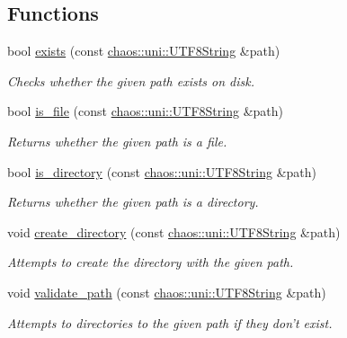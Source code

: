 \subsection*{Functions}
\begin{DoxyCompactItemize}
\item 
bool \hyperlink{namespacechaos_1_1io_1_1file_a30e2d7207df6af04322b7f9e11674825}{exists} (const \hyperlink{classchaos_1_1uni_1_1_u_t_f8_string}{chaos\-::uni\-::\-U\-T\-F8\-String} \&path)
\begin{DoxyCompactList}\small\item\em Checks whether the given path exists on disk. \end{DoxyCompactList}\item 
bool \hyperlink{namespacechaos_1_1io_1_1file_a310de03ae6c868be8379dc49fe45ea4d}{is\-\_\-file} (const \hyperlink{classchaos_1_1uni_1_1_u_t_f8_string}{chaos\-::uni\-::\-U\-T\-F8\-String} \&path)
\begin{DoxyCompactList}\small\item\em Returns whether the given path is a file. \end{DoxyCompactList}\item 
bool \hyperlink{namespacechaos_1_1io_1_1file_ad9890ac8b9dcf3c948274222995c3ea0}{is\-\_\-directory} (const \hyperlink{classchaos_1_1uni_1_1_u_t_f8_string}{chaos\-::uni\-::\-U\-T\-F8\-String} \&path)
\begin{DoxyCompactList}\small\item\em Returns whether the given path is a directory. \end{DoxyCompactList}\item 
\hypertarget{namespacechaos_1_1io_1_1file_a9d0395c776184dc23973584a80a86d89}{void \hyperlink{namespacechaos_1_1io_1_1file_a9d0395c776184dc23973584a80a86d89}{create\-\_\-directory} (const \hyperlink{classchaos_1_1uni_1_1_u_t_f8_string}{chaos\-::uni\-::\-U\-T\-F8\-String} \&path)}\label{namespacechaos_1_1io_1_1file_a9d0395c776184dc23973584a80a86d89}

\begin{DoxyCompactList}\small\item\em Attempts to create the directory with the given path. \end{DoxyCompactList}\item 
void \hyperlink{namespacechaos_1_1io_1_1file_a85365416303132fc0e8691af65fdcf41}{validate\-\_\-path} (const \hyperlink{classchaos_1_1uni_1_1_u_t_f8_string}{chaos\-::uni\-::\-U\-T\-F8\-String} \&path)
\begin{DoxyCompactList}\small\item\em Attempts to directories to the given path if they don't exist. \end{DoxyCompactList}\end{DoxyCompactItemize}


